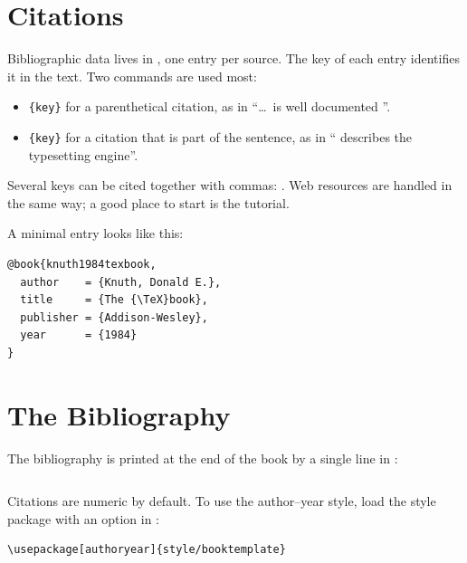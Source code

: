 \section{Citations}\label{sec:citations}

Bibliographic data lives in , one entry per source. The
key of each entry identifies it in the text. Two commands are used most:

\begin{itemize}
  \item {}\texttt{\{key\}} for a parenthetical citation, as in
        \enquote{\ldots\ is well documented \citep{lamport1994latex}}.
  \item {}\texttt{\{key\}} for a citation that is part of the
        sentence, as in \enquote{\citet{knuth1984texbook} describes the
        typesetting engine}.
\end{itemize}

\noindent Several keys can be cited together with commas:
\citep{lamport1994latex,mittelbach2004companion}. Web resources are handled in
the same way; a good place to start is the \citet{overleaf} tutorial.

A minimal entry looks like this:

\begin{lstlisting}[language={}]
@book{knuth1984texbook,
  author    = {Knuth, Donald E.},
  title     = {The {\TeX}book},
  publisher = {Addison-Wesley},
  year      = {1984}
}
\end{lstlisting}

\section{The Bibliography}\label{sec:bibliography}

The bibliography is printed at the end of the book by a single line in
:

\begin{lstlisting}[language={[LaTeX]TeX}]

\end{lstlisting}

\noindent Citations are numeric by default. To use the author--year style,
load the style package with an option in :

\begin{lstlisting}[language={[LaTeX]TeX}]
\usepackage[authoryear]{style/booktemplate}
\end{lstlisting}

